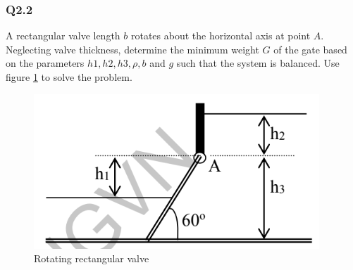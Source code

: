 \subsubsection{Q2.2} A rectangular valve length $ b $ rotates about the horizontal axis at point $ A $. Neglecting valve thickness, determine the minimum weight $ G $ of the gate based on the parameters $  h1, h2, h3, \rho, b $ and $ g $ such that the system is balanced. Use figure \ref{fig:2} to solve the problem.
\begin{figure}[h]
	\centering
	\includegraphics[width=0.4\linewidth]{"2020-08-13 17.45.37 drive.google.com bc14c8504f54"}
	\caption{Rotating rectangular valve}
	\label{fig:2}
\end{figure}
